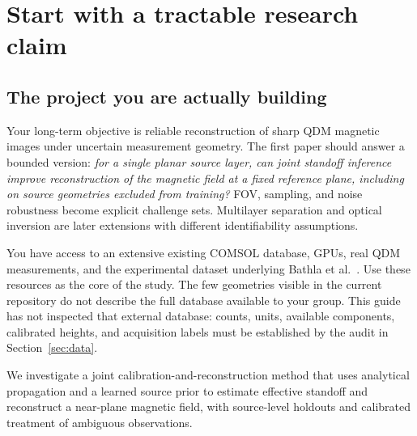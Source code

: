 \section{Start with a tractable research claim}
\label{sec:scope}
\subsection{The project you are actually building}
Your long-term objective is reliable reconstruction of sharp QDM magnetic images under uncertain measurement geometry. The first paper should answer a bounded version: \emph{for a single planar source layer, can joint standoff inference improve reconstruction of the magnetic field at a fixed reference plane, including on source geometries excluded from training?} FOV, sampling, and noise robustness become explicit challenge sets. Multilayer separation and optical inversion are later extensions with different identifiability assumptions.

You have access to an extensive existing COMSOL database, GPUs, real QDM measurements, and the experimental dataset underlying Bathla et al.~\cite{bathla}. Use these resources as the core of the study. The few geometries visible in the current repository do not describe the full database available to your group. This guide has not inspected that external database: counts, units, available components, calibrated heights, and acquisition labels must be established by the audit in Section~\ref{sec:data}.

\begin{tcolorbox}[title=\textbf{A one-sentence working claim}]
We investigate a joint calibration-and-reconstruction method that uses analytical propagation and a learned source prior to estimate effective standoff and reconstruct a near-plane magnetic field, with source-level holdouts and calibrated treatment of ambiguous observations.
\end{tcolorbox}

